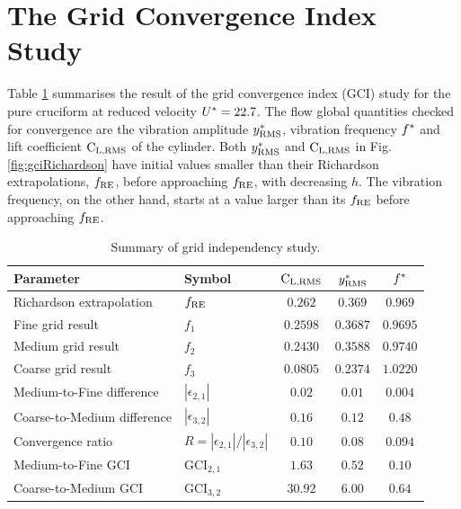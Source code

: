 \documentclass[oneside]{utmthesis}
\begin{document}
\section{The Grid Convergence Index Study} \label{sec:gciStudyResult}

Table \ref{tab:gridIndependency} summarises the result of the grid convergence index (GCI) study for the pure cruciform at reduced velocity $U^{*} = 22.7$. The flow global quantities checked for convergence are the vibration amplitude $y^{*}_{\text{RMS}}$, vibration frequency $f^{*}$ and lift coefficient $\text{C}_{\text{L,RMS}}$ of the cylinder. Both $y^{*}_{\text{RMS}}$ and $\text{C}_{\text{L,RMS}}$ in Fig. \ref{fig:gciRichardson} have initial values smaller than their Richardson extrapolations, $f_{\text{RE}}$, before approaching $f_{\text{RE}}$, with decreasing $h$. The vibration frequency, on the other hand, starts at a value larger than its $f_{\text{RE}}$ before approaching $f_{\text{RE}}$.

\begin{table}[!ht]
\centering
\caption{Summary of grid independency study.} \label{tab:gridIndependency}
\vspace{\baselineskip}
\setlength{\tabcolsep}{10pt}      %
\renewcommand{\arraystretch}{1.5} %
\begin{tabular}{l l c c c}
  \hline
  \hline
Parameter                   & Symbol                                                                  & $\text{C}_{\text{L,RMS}}$ & $y^{*}_{\text{RMS}}$  & $f^{*}$  \\
  \hline
Richardson extrapolation    & $f_{\text{RE}}$                                                                  & $0.262$  & $0.369$  & $0.969$  \\
Fine grid result            & $f_{1}$                                                                 & $0.2598$ & $0.3687$ & $0.9695$ \\
Medium grid result          & $f_{2}$                                                                 & $0.2430$ & $0.3588$ & $0.9740$ \\
Coarse grid result          & $f_{3}$                                                                 & $0.0805$ & $0.2374$ & $1.0220$ \\
Medium-to-Fine difference   & $\left | \epsilon_{2,1} \right |$                                       & $0.02$   & $0.01$   & $0.004$  \\
Coarse-to-Medium difference & $\left | \epsilon_{3,2} \right |$                                       & $0.16$   & $0.12$   & $0.48$   \\
Convergence ratio           & $R = \left | \epsilon_{2,1} \right | / \left | \epsilon_{3,2} \right |$ & $0.10$   & $0.08$   & $0.094$  \\
Medium-to-Fine GCI          & $\text{GCI}_{2,1}$                                                      & $1.63$   & $0.52$   & $0.10$   \\
Coarse-to-Medium GCI        & $\text{GCI}_{3,2}$                                                      & $30.92$  & $6.00$   & $0.64$   \\
  \hline
  \hline
\end{tabular}
\end{table}
\end{document}
